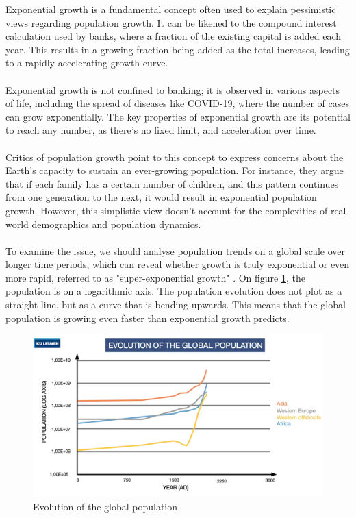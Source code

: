 \documentclass[../summary.tex]{subfiles}
\begin{document}
Exponential growth is a fundamental concept often used to explain pessimistic views regarding population growth. It can be likened to the compound interest calculation used by banks, where a fraction of the existing capital is added each year. This results in a growing fraction being added as the total increases, leading to a rapidly accelerating growth curve.\\
 \\
Exponential growth is not confined to banking; it is observed in various aspects of life, including the spread of diseases like COVID-19, where the number of cases can grow exponentially. The key properties of exponential growth are its potential to reach any number, as there's no fixed limit, and acceleration over time.\\
\\
Critics of population growth point to this concept to express concerns about the Earth's capacity to sustain an ever-growing population. For instance, they argue that if each family has a certain number of children, and this pattern continues from one generation to the next, it would result in exponential population growth. However, this simplistic view doesn't account for the complexities of real-world demographics and population dynamics.\\
\\
To examine the issue, we should analyse population trends on a global scale over longer time periods, which can reveal whether growth is truly exponential or even more rapid, referred to as "super-exponential growth" .  On figure \ref{fig:evolutionoftheglobalpopulation}, the population is on a logarithmic axis. The population evolution does not plot as a straight line, but as a curve that is bending upwards. This means that the global population is growing even faster than exponential growth predicts. 
 
 \begin{figure}[H]
 	\centering
 	\includegraphics[width=0.8\linewidth]{../images/evolution_of_the_global_population}
 	\caption{Evolution of the global population}
 	\label{fig:evolutionoftheglobalpopulation}
 \end{figure}
 
\end{document}
